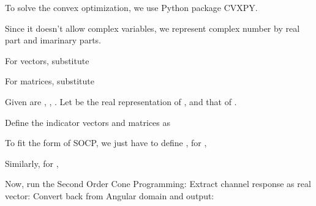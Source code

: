 {
\I To solve the convex optimization, we use Python package CVXPY.

\I Since it doesn't allow complex variables, we represent complex number by real part and imarinary parts.

\I For vectors, substitute

\I For matrices, substitute
}
{
\I Given are , , .
Let  be the real representation of , and  that of .

\I Define the indicator vectors and matrices as
}
{
\I To fit the form of SOCP, we just have to define , for ,

\I Similarly, for ,
}
{
\I Now, run the Second Order Cone Programming:
\I Extract channel response as real vector:
\I Convert back from Angular domain and output:
}
